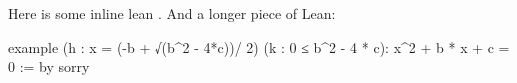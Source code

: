 \documentclass{article}
\begin{document}
Here is some inline lean . And a longer piece of Lean:

\begin{leancode}
example (h : x = (-b + √(b^2 - 4*c))/ 2)
  (k : 0 ≤ b^2 - 4 * c):  x^2 + b * x + c = 0 := by
    sorry
\end{leancode}
\end{document}
